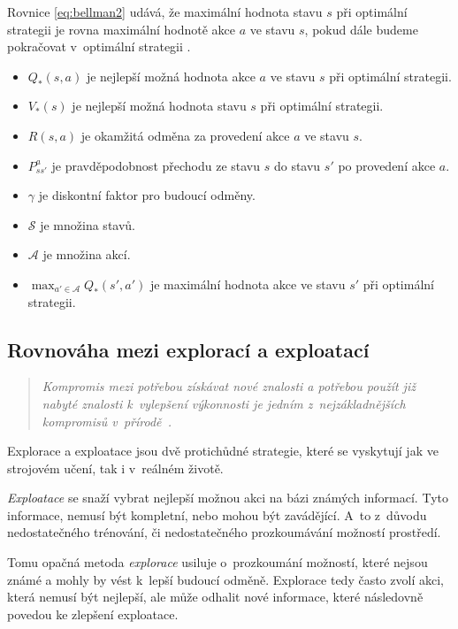 Rovnice \ref{eq:bellman2} udává, že maximální hodnota stavu $s$ při optimální strategii je rovna maximální hodnotě akce $a$ ve stavu $s$, pokud dále budeme pokračovat v~optimální strategii \cite{RL_basics}.

\begin{itemize}
  \item $Q_*(s, a)$ je nejlepší možná hodnota akce $a$ ve stavu $s$ při optimální strategii.\cite{RL_basics}
  \item $V_*(s)$ je nejlepší možná hodnota stavu $s$ při optimální strategii.
  \item $R(s, a)$ je okamžitá odměna za provedení akce $a$ ve stavu $s$.
  \item $P_{ss'}^a$ je pravděpodobnost přechodu ze stavu $s$ do stavu $s'$ po provedení akce $a$.
  \item $\gamma$ je diskontní faktor pro budoucí odměny.
  \item $\mathcal{S}$ je množina stavů.
  \item $\mathcal{A}$ je množina akcí.
  \item $\max_{a' \in \mathcal{A}} Q_*(s', a')$ je maximální hodnota akce ve stavu $s'$ při optimální strategii.
\end{itemize}    


\subsection{Rovnováha mezi explorací a exploatací}
\label{subsec:exploration-exploitation-dillemma}
\begin{quote}
  \emph{Kompromis mezi potřebou získávat nové znalosti a potřebou použít již nabyté znalosti k~vylepšení výkonnosti je jedním z~nejzákladnějších kompromisů v~přírodě~\cite{Exploitation_Exploration}.}
\end{quote}
Explorace a exploatace jsou dvě protichůdné strategie, které se vyskytují jak ve strojovém učení, tak i v~reálném životě.

\emph{Exploatace} se snaží vybrat nejlepší možnou akci na bázi známých informací.
Tyto informace, nemusí být kompletní, nebo mohou být zavádějící.
A~to z~důvodu nedostatečného trénování, či nedostatečného prozkoumávání možností prostředí.

Tomu opačná metoda \emph{explorace} usiluje o~prozkoumání možností, které nejsou známé a mohly by vést k~lepší budoucí odměně.
Explorace tedy často zvolí akci, která nemusí být nejlepší, ale může odhalit nové informace, které následovně povedou ke zlepšení exploatace.

